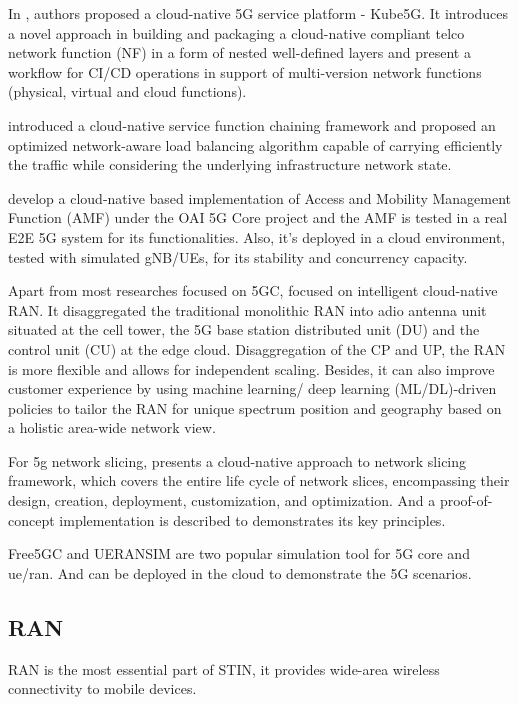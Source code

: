 \documentclass[12pt, draftclsnofoot, onecolumn]{IEEEtran}
\begin{document}
In \cite{arouk2020kube5g}, authors proposed a cloud-native 5G service platform - Kube5G. It introduces a novel approach in building and packaging a cloud-native compliant telco network function (NF) in a form of nested well-defined layers and present a workflow for CI/CD operations in support of multi-version network functions (physical, virtual and cloud functions).

\cite{dab2020cloud} \cite{dab2020efficient} introduced a cloud-native service function chaining framework and proposed an optimized network-aware load balancing algorithm capable of carrying efficiently the traffic while considering the underlying infrastructure network state.

\cite{du2020cloud} develop a cloud-native based implementation of Access and Mobility Management Function (AMF) under the OAI 5G Core project and the AMF is tested in a real E2E 5G system for its functionalities. Also, it's deployed in a cloud environment, tested with simulated gNB/UEs, for its stability and concurrency capacity.

Apart from most researches focused on 5GC, \cite{balasubramanian2021ric} focused on intelligent cloud-native RAN. It disaggregated the traditional monolithic RAN into adio antenna unit situated at the cell tower, the 5G base station distributed unit (DU) and the control unit (CU) at the edge cloud. Disaggregation of the CP and UP, the RAN is more flexible and allows for independent scaling. Besides, it can also improve customer experience by using machine learning/ deep learning (ML/DL)-driven policies to tailor the RAN for unique spectrum position and geography based on a holistic area-wide network view. 


For 5g network slicing, \cite{sharma2017cloud} presents a cloud-native approach to network slicing framework, which covers the entire life cycle of network slices, encompassing their design, creation, deployment, customization, and optimization. And a proof-of-concept implementation is described to demonstrates its key principles. 

Free5GC \cite{free5gc} and UERANSIM\cite{ueransim} are two popular simulation tool for 5G core and ue/ran. And can be deployed in the cloud to demonstrate the 5G scenarios.

\subsection{RAN}
RAN is the most essential part of STIN, it provides wide-area wireless connectivity to mobile devices.
\end{document}
